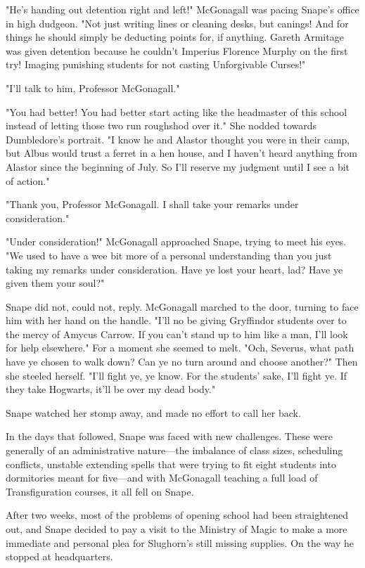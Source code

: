 "He's handing out detention right and left!" McGonagall was pacing Snape's office in high dudgeon. "Not just writing lines or cleaning desks, but canings! And for things he should simply be deducting points for, if anything. Gareth Armitage was given detention because he couldn't Imperius Florence Murphy on the first try! Imaging punishing students for not casting Unforgivable Curses!"

"I'll talk to him, Professor McGonagall."

"You had better! You had better start acting like the headmaster of this school instead of letting those two run roughshod over it." She nodded towards Dumbledore's portrait. "I know he and Alastor thought you were in their camp, but Albus would trust a ferret in a hen house, and I haven't heard anything from Alastor since the beginning of July. So I'll reserve my judgment until I see a bit of action."

"Thank you, Professor McGonagall. I shall take your remarks under consideration."

"Under consideration!" McGonagall approached Snape, trying to meet his eyes. "We used to have a wee bit more of a personal understanding than you just taking my remarks under consideration. Have ye lost your heart, lad? Have ye given them your soul?"

Snape did not, could not, reply. McGonagall marched to the door, turning to face him with her hand on the handle. "I'll no be giving Gryffindor students over to the mercy of Amycus Carrow. If you can't stand up to him like a man, I'll look for help elsewhere." For a moment she seemed to melt. "Och, Severus, what path have ye chosen to walk down? Can ye no turn around and choose another?" Then she steeled herself. "I'll fight ye, ye know. For the students' sake, I'll fight ye. If they take Hogwarts, it'll be over my dead body."

Snape watched her stomp away, and made no effort to call her back.

In the days that followed, Snape was faced with new challenges. These were generally of an administrative nature—the imbalance of class sizes, scheduling conflicts, unstable extending spells that were trying to fit eight students into dormitories meant for five—and with McGonagall teaching a full load of Transfiguration courses, it all fell on Snape.

After two weeks, most of the problems of opening school had been straightened out, and Snape decided to pay a visit to the Ministry of Magic to make a more immediate and personal plea for Slughorn's still missing supplies. On the way he stopped at headquarters.

